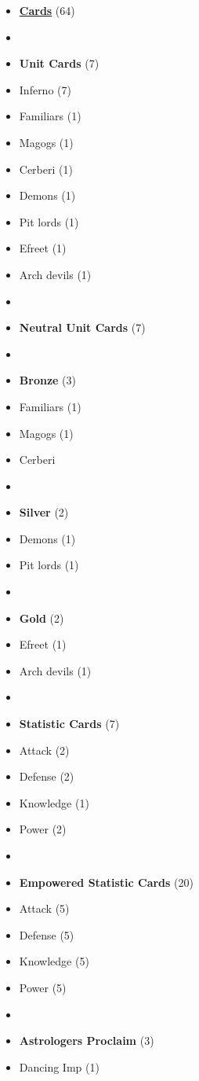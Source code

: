 \begin{multicols*}{3}
\begin{itemize}[leftmargin=0pt, label={}, noitemsep, noitemsep]
  \item \textbf{\small{\underline{Cards}}} (64)
  \item
  \item \textbf{Unit Cards} (7)
  \item Inferno (7)
  \item Familiars (1)
  \item Magogs (1)
  \item Cerberi (1)
  \item Demons (1)
  \item Pit lords (1)
  \item Efreet (1)
  \item Arch devils (1)
  \item
  \item \textbf{Neutral Unit Cards} (7)
  \item
  \item \textbf{Bronze} (3)
  \item Familiars (1)
  \item Magogs (1)
  \item Cerberi
  \item
  \item \textbf{Silver} (2)
  \item Demons (1)
  \item Pit lords (1)
  \item
  \item \textbf{Gold} (2)
  \item Efreet (1)
  \item Arch devils (1)
  \item
  \item \textbf{Statistic Cards} (7)
  \item Attack (2)
  \item Defense (2)
  \item Knowledge (1)
  \item Power (2)
  \item
  \item \textbf{Empowered Statistic Cards} (20)
  \item Attack (5)
  \item Defense (5)
  \item Knowledge (5)
  \item Power (5)
  \item
  \item \textbf{Astrologers Proclaim} (3)
  \item Dancing Imp (1)

\end{itemize}
\end{multicols*}
